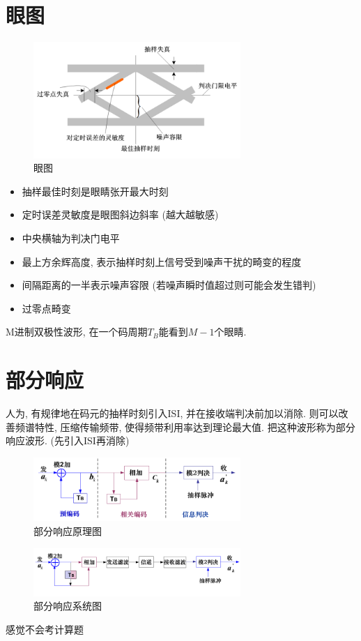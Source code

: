 \documentclass[a4paper]{report}
\begin{document}
\section{眼图}
\begin{figure}[H]
\centering
\includegraphics[width=0.7\textwidth]{eye.png}
\caption{眼图}
\end{figure}
\begin{itemize}
  \item 抽样最佳时刻是眼睛张开最大时刻
  \item 定时误差灵敏度是眼图斜边斜率 (越大越敏感)
  \item 中央横轴为判决门电平
  \item 最上方余辉高度, 表示抽样时刻上信号受到噪声干扰的畸变的程度
  \item 间隔距离的一半表示噪声容限 (若噪声瞬时值超过则可能会发生错判)
  \item 过零点畸变
\end{itemize}
M进制双极性波形, 在一个码周期$T_B$能看到$M-1$个眼睛. 
\section{部分响应}
人为, 有规律地在码元的抽样时刻引入ISI, 并在接收端判决前加以消除. 则可以改善频谱特性, 压缩传输频带, 使得频带利用率达到理论最大值. 把这种波形称为部分响应波形. 
(先引入ISI再消除)
\begin{figure}[H]
\centering
\includegraphics[width=0.7\textwidth]{partial_resp.png}
\caption{部分响应原理图}
\end{figure}
\begin{figure}[H]
\centering
\includegraphics[width=0.7\textwidth]{partial_resp_sys.png}
\caption{部分响应系统图}
\end{figure}
感觉不会考计算题
\end{document}
